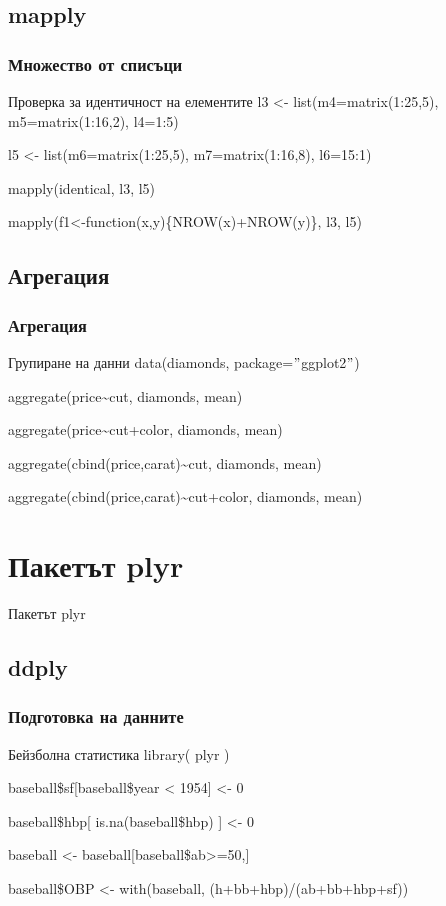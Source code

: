 \documentclass{beamer}
\begin{document}
\subsection{mapply}

\begin{frame}
\frametitle{Множество от списъци}
\begin{block}{Проверка за идентичност на елементите}
l3 <- list(m4=matrix(1:25,5), m5=matrix(1:16,2), l4=1:5)

l5 <- list(m6=matrix(1:25,5), m7=matrix(1:16,8), l6=15:1)

mapply(identical, l3, l5)

mapply(f1<-function(x,y)\{NROW(x)+NROW(y)\}, l3, l5)
\end{block}
\end{frame}

\subsection{Агрегация}

\begin{frame}
\frametitle{Агрегация}
\begin{block}{Групиране на данни}
data(diamonds, package=$"$ggplot2$"$)

aggregate(price\textasciitilde cut, diamonds, mean)

aggregate(price\textasciitilde cut+color, diamonds, mean)

aggregate(cbind(price,carat)\textasciitilde cut, diamonds, mean)

aggregate(cbind(price,carat)\textasciitilde cut+color, diamonds, mean)
\end{block}
\end{frame}

\section{Пакетът plyr}

\begin{frame}
\center \huge{Пакетът plyr}
\end{frame}

\subsection{ddply}

\begin{frame}
\frametitle{Подготовка на данните}
\begin{block}{Бейзболна статистика}
library( plyr )

baseball\$sf[baseball\$year < 1954] <- 0

baseball\$hbp[ is.na(baseball\$hbp) ] <- 0

baseball <- baseball[baseball\$ab>=50,]

baseball\$OBP <- with(baseball, (h+bb+hbp)/(ab+bb+hbp+sf))
\end{block}
\end{frame}
\end{document}
